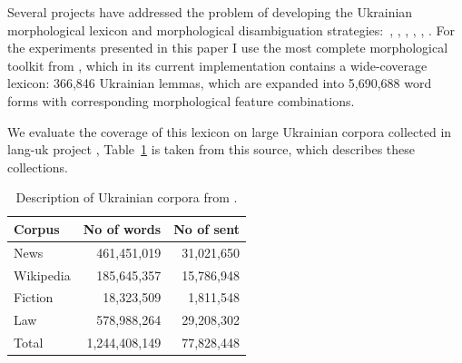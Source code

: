 \documentclass[11pt,a4paper]{article}
\begin{document}
Several projects have addressed the problem of developing the Ukrainian morphological lexicon and morphological disambiguation strategies:~\cite{gryaznukhina-ed-1989}, \cite{gryaznukhina-ed-1999}, \cite{Rysin-Starko-2019}, \cite{kotsyba2009ugtag}, \cite{kotsyba2010multext}, \cite{babych2016ukrainian}. For the experiments presented in this paper I use the most complete morphological toolkit from \cite{Rysin-Starko-2019}, which in its current implementation contains a wide-coverage lexicon: 366,846 Ukrainian lemmas, which are expanded into 5,690,688 word forms with corresponding morphological feature combinations.

We evaluate the coverage of this lexicon on large Ukrainian corpora collected in lang-uk project \cite{Dyomkin-2019}, Table~\ref{lang-uk-corpus-description} is taken from this source, which describes these collections.


\begin{table}[]
	\begin{center}
		\begin{tabular}{|l|rr|}
			\hline \textbf{Corpus} & \textbf{No of words} & \textbf{No of sent} \\ \hline
			News & 461,451,019 & 31,021,650 \\
			Wikipedia & 185,645,357 & 15,786,948 \\
			Fiction & 18,323,509 & 1,811,548 \\
			Law  & 578,988,264 & 29,208,302 \\
			\hline
			Total & 1,244,408,149 &  77,828,448\\
			\hline
		\end{tabular}
	\end{center}
	\caption{\label{lang-uk-corpus-description} Description of Ukrainian corpora from \cite{Dyomkin-2019}. }
\end{table}
\end{document}
